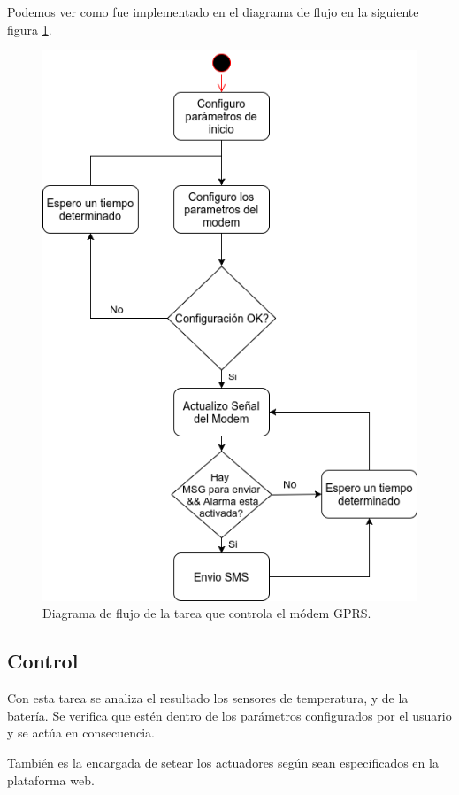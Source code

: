 Podemos ver como fue implementado en el diagrama de flujo en la siguiente figura \ref{fig:modem_task}.

\begin{figure}[!htb]
  \centering
  \includegraphics[scale=.5]{./Figures/modem_task.png}
  \caption{Diagrama de flujo de la tarea que controla el módem GPRS.}
  \label{fig:modem_task}
\end{figure}


\subsection*{Control}
Con esta tarea se analiza el resultado los sensores de temperatura, y de la batería. Se verifica que estén dentro de los parámetros configurados por el usuario y se actúa en consecuencia.

También es la encargada de setear los actuadores según sean especificados en la plataforma web.


